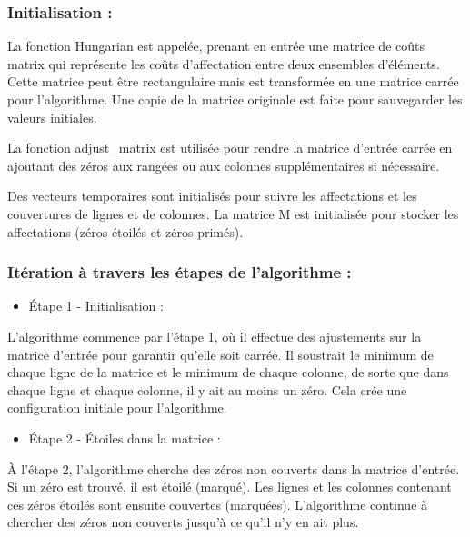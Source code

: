 \documentclass[
]{article}
\providecommand{\tightlist}{%
  \setlength{\itemsep}{0pt}\setlength{\parskip}{0pt}}
\begin{document}
\hypertarget{initialisation}{%
\subsubsection{Initialisation :}\label{initialisation}}

La fonction Hungarian est appelée, prenant en entrée une matrice de
coûts matrix qui représente les coûts d'affectation entre deux ensembles
d'éléments. Cette matrice peut être rectangulaire mais est transformée
en une matrice carrée pour l'algorithme. Une copie de la matrice
originale est faite pour sauvegarder les valeurs initiales.

La fonction adjust\_matrix est utilisée pour rendre la matrice d'entrée
carrée en ajoutant des zéros aux rangées ou aux colonnes supplémentaires
si nécessaire.

Des vecteurs temporaires sont initialisés pour suivre les affectations
et les couvertures de lignes et de colonnes. La matrice M est
initialisée pour stocker les affectations (zéros étoilés et zéros
primés).

\hypertarget{ituxe9ration-uxe0-travers-les-uxe9tapes-de-lalgorithme}{%
\subsubsection{Itération à travers les étapes de l'algorithme
:}\label{ituxe9ration-uxe0-travers-les-uxe9tapes-de-lalgorithme}}

\begin{itemize}
\tightlist
\item
  Étape 1 - Initialisation :
\end{itemize}

L'algorithme commence par l'étape 1, où il effectue des ajustements sur
la matrice d'entrée pour garantir qu'elle soit carrée. Il soustrait le
minimum de chaque ligne de la matrice et le minimum de chaque colonne,
de sorte que dans chaque ligne et chaque colonne, il y ait au moins un
zéro. Cela crée une configuration initiale pour l'algorithme.

\begin{itemize}
\tightlist
\item
  Étape 2 - Étoiles dans la matrice :
\end{itemize}

À l'étape 2, l'algorithme cherche des zéros non couverts dans la matrice
d'entrée. Si un zéro est trouvé, il est étoilé (marqué). Les lignes et
les colonnes contenant ces zéros étoilés sont ensuite couvertes
(marquées). L'algorithme continue à chercher des zéros non couverts
jusqu'à ce qu'il n'y en ait plus.
\end{document}

